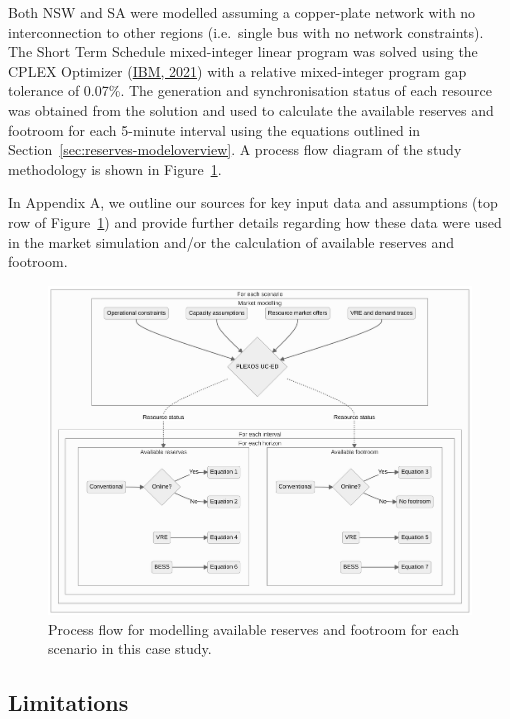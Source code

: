 \documentclass[12pt,a4paper,]{report}
\begin{document}
Both NSW and SA were modelled assuming a copper-plate network with no
interconnection to other regions (i.e.~single bus with no network
constraints). The Short Term Schedule mixed-integer linear program was
solved using the CPLEX Optimizer
(\protect\hyperlink{ref-ibmCPLEXOptimizer2021}{IBM, 2021}) with a
relative mixed-integer program gap tolerance of 0.07\%. The generation
and synchronisation status of each resource was obtained from the
solution and used to calculate the available reserves and footroom for
each 5-minute interval using the equations outlined in
Section~\ref{sec:reserves-modeloverview}. A process flow diagram of the
study methodology is shown in Figure~\ref{fig:method_diagram}.

In Appendix A, we outline our sources for key input data and assumptions
(top row of Figure~\ref{fig:method_diagram}) and provide further details
regarding how these data were used in the market simulation and/or the
calculation of available reserves and footroom.

\begin{figure}
\hypertarget{fig:method_diagram}{%
\centering
\includegraphics[width=1\textwidth,height=\textheight]{source/figures/modelling_diagram.png}
\caption[Process flow diagram for modelling available reserves and
footroom for each scenario]{Process flow for modelling available
reserves and footroom for each scenario in this case
study.}\label{fig:method_diagram}
}
\end{figure}

\hypertarget{limitations-1}{%
\subsection{Limitations}\label{limitations-1}}
\end{document}
